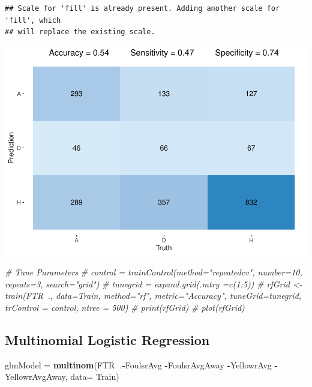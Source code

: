 \documentclass[
]{article}
\newenvironment{Shaded}{\begin{snugshade}}{\end{snugshade}}
\newcommand{\CommentTok}[1]{\textcolor[rgb]{0.56,0.35,0.01}{\textit{#1}}}
\newcommand{\DataTypeTok}[1]{\textcolor[rgb]{0.13,0.29,0.53}{#1}}
\newcommand{\KeywordTok}[1]{\textcolor[rgb]{0.13,0.29,0.53}{\textbf{#1}}}
\newcommand{\NormalTok}[1]{#1}
\newcommand{\OperatorTok}[1]{\textcolor[rgb]{0.81,0.36,0.00}{\textbf{#1}}}
\newcommand{\StringTok}[1]{\textcolor[rgb]{0.31,0.60,0.02}{#1}}
\begin{document}
\begin{verbatim}
## Scale for 'fill' is already present. Adding another scale for 'fill', which
## will replace the existing scale.
\end{verbatim}

\begin{center}\includegraphics{EPL_Model_files/figure-latex/unnamed-chunk-9-1} \end{center}

\begin{Shaded}
\begin{Highlighting}[]
\CommentTok{# Tune Parameters}
\CommentTok{# control = trainControl(method="repeatedcv", number=10, repeats=3, search="grid")}
\CommentTok{# tunegrid = expand.grid(.mtry =c(1:5))}
\CommentTok{# rfGrid <- train(FTR~., data=Train, method="rf", metric="Accuracy", tuneGrid=tunegrid, trControl = control, ntree = 500)}
\CommentTok{# print(rfGrid)}
\CommentTok{# plot(rfGrid)}
\end{Highlighting}
\end{Shaded}

\hypertarget{multinomial-logistic-regression}{%
\subsection{Multinomial Logistic
Regression}\label{multinomial-logistic-regression}}

\begin{Shaded}
\begin{Highlighting}[]
\NormalTok{glmModel =}\StringTok{ }\KeywordTok{multinom}\NormalTok{(FTR}\OperatorTok{~}\NormalTok{.}\OperatorTok{-}\NormalTok{FoulsrAvg  }\OperatorTok{-}\NormalTok{FoulsrAvgAway }\OperatorTok{-}\NormalTok{YellowrAvg }\OperatorTok{-}\NormalTok{YellowrAvgAway, }\DataTypeTok{data=}\NormalTok{ Train)}
\end{Highlighting}
\end{Shaded}
\end{document}
